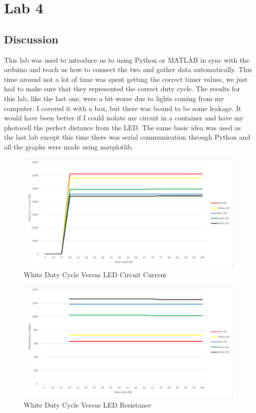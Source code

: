 \documentclass[12pt,titlepage]{article}
\begin{document}
\section{Lab 4}
\subsection{Discussion}
This lab was used to introduce us to using Python or MATLAB in sync with the arduino and teach us how to connect the two and gather data automatically.
This time around not a lot of time was spent getting the correct timer values, we just had to make sure that they represented the correct duty cycle.
The results for this lab, like the last one, were a bit worse due to lights coming from my computer. I covered it with a box, but there was bound to be some leakage.
It would have been better if I could isolate my circuit in a container and have my photocell the perfect distance from the LED. The same basic idea was used as the
last lab except this time there was serial communication through Python and all the graphs were made using matplotlib.
\begin{figure}[!htb]
    \centering
    \includegraphics[width=5in]{lab_4/duty_cycle_led_circuit_curr.png}
    \caption{White Duty Cycle Versus LED Circuit Current}\label{fig:white_lab_4_duty_cycle_led_circuit_curr}
\end{figure}
\begin{figure}[!htb]
    \centering
    \includegraphics[width=5in]{lab_4/duty_cycle_led_res.png}
    \caption{White Duty Cycle Versus LED Resistance}\label{fig:white_lab_4_duty_cycle_led_res}
\end{figure}
\end{document}
